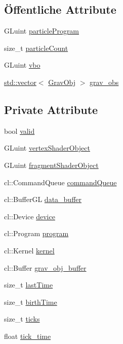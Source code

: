 \subsection*{Öffentliche Attribute}
\begin{DoxyCompactItemize}
\item 
G\-Luint \hyperlink{classParticleSystem_a817935d44dad68d336c6806bb764fa8a}{particle\-Program}
\item 
size\-\_\-t \hyperlink{classParticleSystem_a23f9a394b3c1eeb10f67a78daa2d47b6}{particle\-Count}
\item 
G\-Luint \hyperlink{classParticleSystem_afde2a8d8d82c9c569de9424610bd3da6}{vbo}
\item 
\hyperlink{classstd_1_1vector}{std\-::vector}$<$ \hyperlink{structParticleSystem_1_1GravObj}{Grav\-Obj} $>$ \hyperlink{classParticleSystem_ac4cc696d0bf251930d64b668be9c3d37}{grav\-\_\-obs}
\end{DoxyCompactItemize}
\subsection*{Private Attribute}
\begin{DoxyCompactItemize}
\item 
bool \hyperlink{classParticleSystem_a6541039a541fddd38220c8bde2b4f4ac}{valid}
\item 
G\-Luint \hyperlink{classParticleSystem_ac269ed2dcffba188047f99bab97a70cf}{vertex\-Shader\-Object}
\item 
G\-Luint \hyperlink{classParticleSystem_a251373b8c7051e8a67562d16114329fa}{fragment\-Shader\-Object}
\item 
cl\-::\-Command\-Queue \hyperlink{classParticleSystem_a6662c30fc239f2598b0d35f4be1ebb9e}{command\-Queue}
\item 
cl\-::\-Buffer\-G\-L \hyperlink{classParticleSystem_a30d6a0f710c6f8412415491214b3fb38}{data\-\_\-buffer}
\item 
cl\-::\-Device \hyperlink{classParticleSystem_a4772219c2578dfc5cfbe01cacec8a4c4}{device}
\item 
cl\-::\-Program \hyperlink{classParticleSystem_ab2149ec3d27d4e7db0f94d70bcfe092b}{program}
\item 
cl\-::\-Kernel \hyperlink{classParticleSystem_a706e75308abfa8ee7ffd7661de81791b}{kernel}
\item 
cl\-::\-Buffer \hyperlink{classParticleSystem_a311fcb97909db73f9096b663df952dce}{grav\-\_\-obj\-\_\-buffer}
\item 
size\-\_\-t \hyperlink{classParticleSystem_a7742c69f3c78fb025a3a8f0cb56aa272}{last\-Time}
\item 
size\-\_\-t \hyperlink{classParticleSystem_ad01d21eff34d51267b5ec1b67abcd450}{birth\-Time}
\item 
size\-\_\-t \hyperlink{classParticleSystem_a32d3efc1966cace76ec11e581716777b}{ticks}
\item 
float \hyperlink{classParticleSystem_a74f4d4516a33478923b79766c54cbb13}{tick\-\_\-time}
\end{DoxyCompactItemize}


